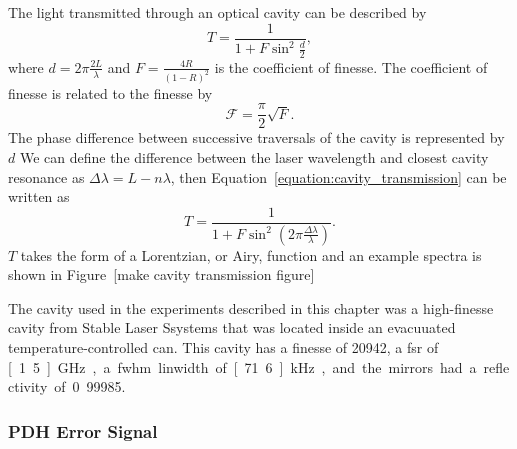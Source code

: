 {The light transmitted through an optical cavity can be described by~\cite{pedrotti_introduction_2007}
\begin{equation}\label{equation:cavity_transmission}
T = \frac{1}{1+F\sin^2\frac{d}{2}},
\end{equation}
where $d=2\pi\frac{2L}{\lambda}$ and $F=\frac{4R}{\left(1-R\right)^2}$ is the coefficient of finesse.
The coefficient of finesse is related to the finesse by
\begin{equation}
\mathscr{F}=\frac{\pi}{2}\sqrt{F}.
\end{equation}
The phase difference between successive traversals of the cavity is represented by $d$
We can define the difference between the laser wavelength and closest cavity resonance as $\Delta\lambda=L-n\lambda$, then Equation~\ref{equation:cavity_transmission} can be written as
\begin{equation}
T = \frac{1}{1+F\sin^2\left(2\pi\frac{\Delta\lambda}{\lambda}\right)}.
\end{equation}
$T$ takes the form of a Lorentzian, or Airy, function and an example spectra is shown in Figure~{\color{red}[make cavity transmission figure]}

The cavity used in the experiments described in this chapter was a high-finesse cavity from Stable Laser Ssystems that was located inside an evacuuated temperature-controlled can.
This cavity has a finesse of 20942, a \gls{fsr} of \unit[1.5]{GHz}, a \gls{fwhm} linwidth of \unit[71.6]{kHz}, and the mirrors had a reflectivity of 0.99985.
}

\subsubsection{PDH Error Signal}


